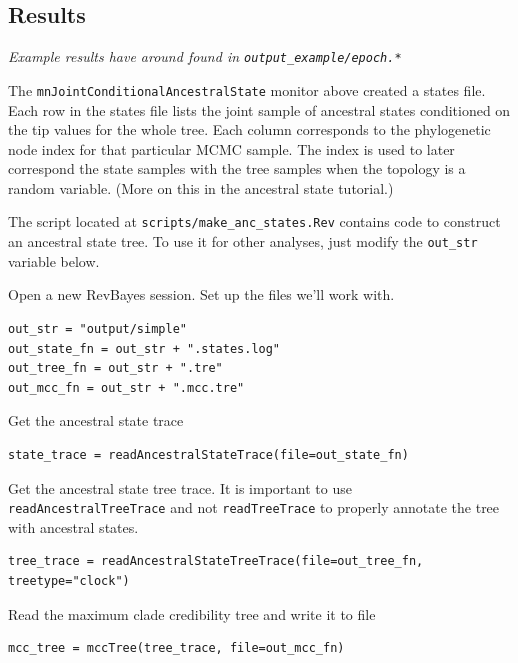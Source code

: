 \subsection*{Results}

{\it Example results have around found in {\tt output\_example/epoch.*} }

The {\tt mnJointConditionalAncestralState} monitor above created a states file.
Each row in the states file lists the joint sample of ancestral states conditioned on the tip values for the whole tree.
Each column corresponds to the phylogenetic node index for that particular MCMC sample.
The index is used to later correspond the state samples with the tree samples when the topology is a random variable.
(More on this in the ancestral state tutorial.)

The script located at {\tt scripts/make\_anc\_states.Rev} contains code to construct an ancestral state tree.
To use it for other analyses, just modify the {\tt out\_str} variable below.

Open a new RevBayes session. Set up the files we'll work with.
\begin{snugshade}
\begin{lstlisting}
out_str = "output/simple"
out_state_fn = out_str + ".states.log"
out_tree_fn = out_str + ".tre"
out_mcc_fn = out_str + ".mcc.tre" 
\end{lstlisting}
\end{snugshade}


Get the ancestral state trace

\begin{snugshade}
\begin{lstlisting}
state_trace = readAncestralStateTrace(file=out_state_fn)
\end{lstlisting}
\end{snugshade}


Get the ancestral state tree trace. It is important to use {\tt readAncestralTreeTrace} and not {\tt readTreeTrace} to properly annotate the tree with ancestral states.

\begin{snugshade}
\begin{lstlisting}
tree_trace = readAncestralStateTreeTrace(file=out_tree_fn, treetype="clock")
\end{lstlisting}
\end{snugshade}

Read the maximum clade credibility tree and write it to file

\begin{snugshade}
\begin{lstlisting}
mcc_tree = mccTree(tree_trace, file=out_mcc_fn)
\end{lstlisting}
\end{snugshade}


